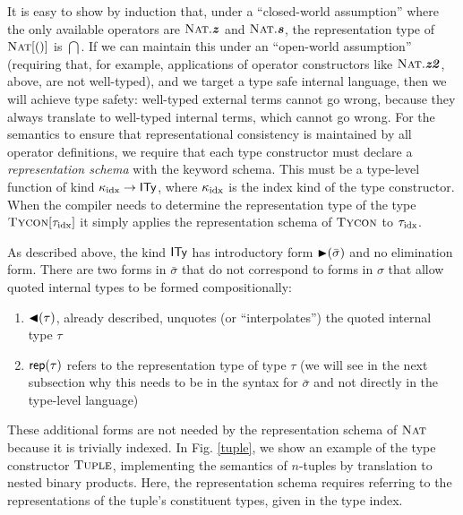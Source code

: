 \documentclass[9pt,preprint]{sigplanconf}
\begin{document}
It is easy to show by induction that, under a ``closed-world assumption'' where the only available operators are $\textsc{Nat}.\textbf{\textit{z}}$ and $\textsc{Nat}.\textbf{\textit{s}}$, the representation type of $\textsc{Nat}[()]$ is $\dint$. If we can maintain this under an ``open-world assumption'' (requiring that, for example, applications of operator constructors like $\textsc{Nat}.\textbf{\textit{z2}}$, above, are not well-typed), and we target a type safe internal language, then we will achieve type safety: well-typed external terms cannot go wrong, because they always translate to well-typed internal terms, which cannot go wrong. For the semantics to ensure that representational consistency is maintained by all operator definitions, we require that each type constructor must declare a \emph{representation schema} with the keyword \textsf{schema}. This must be a type-level function of kind $\kappa_{\text{idx}}\rightarrow{\textsf{ITy}}$, where $\kappa_{\text{idx}}$ is the index kind of the type constructor. When the compiler needs to determine the representation type of the type $\textsc{Tycon}[{\tau_{\text{idx}}}]$ it simply applies the representation schema of $\textsc{Tycon}$ to ${{\tau_{\text{idx}}}}$.

As described above, the kind $\textsf{ITy}$ has introductory form ${\blacktriangleright}(\bar \sigma)$ and no elimination form. There are two forms in $\bar \sigma$ that do not correspond to forms in $\sigma$ that allow quoted internal types to be formed compositionally:
\begin{enumerate}
\item ${\blacktriangleleft}(\tau)$, already described, unquotes (or ``interpolates'') the quoted internal type $\tau$
\item ${\sf rep}(\tau)$ refers to the representation type of type $\tau$ (we will see in the next subsection why this needs to be in the syntax for $\bar \sigma$ and not directly in the type-level language)
\end{enumerate}

These additional forms are not needed by the representation schema of $\textsc{Nat}$  because it is trivially indexed. In Fig. \ref{tuple}, we show an example of the type constructor $\textsc{Tuple}$, implementing the semantics of $n$-tuples by translation to nested binary products. Here, the representation schema requires referring to the representations of the tuple's constituent types, given in the type index.
\end{document}
